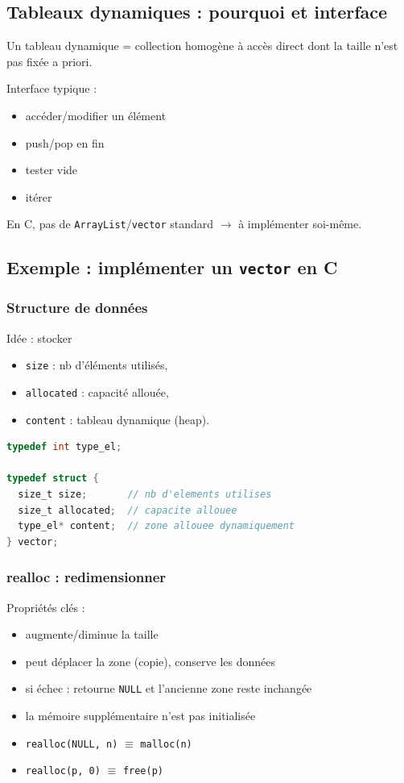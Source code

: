 \subsection{Tableaux dynamiques : pourquoi et interface}
Un tableau dynamique = collection homogène à accès direct dont la taille n’est pas fixée a priori. 

Interface typique :
\begin{itemize}
  \item accéder/modifier un élément
  \item push/pop en fin
  \item tester vide
  \item itérer
\end{itemize}
En C, pas de \texttt{ArrayList}/\texttt{vector} standard $\rightarrow$ à implémenter soi-même.

\subsection{Exemple : implémenter un \texttt{vector} en C}
\subsubsection{Structure de données}
Idée : stocker
\begin{itemize}
  \item \texttt{size} : nb d’éléments utilisés,
  \item \texttt{allocated} : capacité allouée,
  \item \texttt{content} : tableau dynamique (heap). 
\end{itemize}

\begin{lstlisting}[language=C]
typedef int type_el;

typedef struct {
  size_t size;       // nb d'elements utilises
  size_t allocated;  // capacite allouee
  type_el* content;  // zone allouee dynamiquement
} vector;
\end{lstlisting}

\subsubsection{realloc : redimensionner}
Propriétés clés : 
\begin{itemize}
  \item augmente/diminue la taille
  \item peut déplacer la zone (copie), conserve les données
  \item si échec : retourne \texttt{NULL} et l’ancienne zone reste inchangée
  \item la mémoire supplémentaire n’est pas initialisée
  \item \texttt{realloc(NULL, n)} $\equiv$ \texttt{malloc(n)}
  \item \texttt{realloc(p, 0)} $\equiv$ \texttt{free(p)}
\end{itemize}

